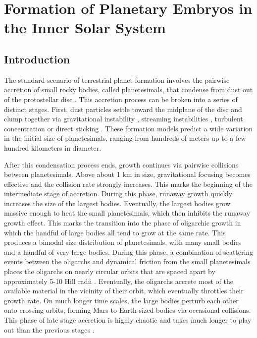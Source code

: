 \chapter {Formation of Planetary Embryos in the Inner Solar System}

\section{Introduction} \label{sec:intro}

The standard scenario of terrestrial planet formation involves the pairwise accretion of small rocky bodies, called planetesimals, 
that condense from dust out of the protostellar disc \cite{safronov69}. This accretion process can be broken into a series of 
distinct stages. First, dust particles settle toward the midplane of the disc and clump together via gravitational instability 
\cite{goldreich73, youdin02}, streaming instabilities \cite{johansen07, johansen15}, turbulent concentration 
\cite{chambers10, cuzzi08, cuzzi10, hopkins16} or direct sticking \cite{okuzumi12, windmark12, garaud13, katoka13}. These 
formation models predict a wide variation in the initial size of planetesimals, ranging from hundreds of meters up to a few 
hundred kilometers in diameter.

After this condensation process ends, growth continues via pairwise collisions between planetesimals. Above about 1 km in size, 
gravitational focusing becomes effective and the collision rate strongly increases. This marks the beginning of the intermediate 
stage of accretion. During this phase, runaway growth \cite{duncan89, kokubo96, barnes09} quickly increases the size of the 
largest bodies. Eventually, the largest bodies grow massive enough to heat the small planetesimals, which then inhibits the 
runaway growth effect. This marks the transition into the phase of oligarchic growth in which the handful of large bodies all tend 
to grow at the same rate. This produces a bimodal size distribution of planetesimals, with many small bodies and a handful of 
very large bodies. During this phase, a combination of scattering events between the oligarchs and dynamical friction from the 
small planetesimals places the oligarchs on nearly circular orbits that are spaced apart by approximately 5-10 Hill radii 
\cite{kokubo98}. Eventually, the oligarchs accrete most of the available material in the vicinity of their orbit, which eventually 
throttles their growth rate. On much longer time scales, the large bodies perturb each other onto crossing orbits, forming Mars to 
Earth sized bodies via occasional collisions. This phase of late stage accretion is highly chaotic and takes much longer to play 
out than the previous stages \cite{chambers98, raymond06}.

